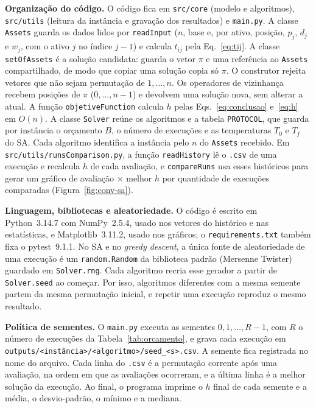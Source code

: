 \textbf{Organização do código.} O código fica em \texttt{src/core} (modelo e algoritmos), \texttt{src/utils} (leitura da instância e gravação dos resultados) e \texttt{main.py}. A classe \texttt{Assets} guarda os dados lidos por \texttt{readInput} ($n$, base e, por ativo, posição, $p_j$, $d_j$ e $w_j$, com o ativo $j$ no índice $j-1$) e calcula $t_{ij}$ pela Eq.~\eqref{eq:tij}. A classe \texttt{setOfAssets} é a solução candidata: guarda o vetor $\pi$ e uma referência ao \texttt{Assets} compartilhado, de modo que copiar uma solução copia só $\pi$. O construtor rejeita vetores que não sejam permutação de $1,\dots,n$. Os operadores de vizinhança recebem posições de $\pi$ ($0,\dots,n-1$) e devolvem uma solução nova, sem alterar a atual. A função \texttt{objetiveFunction} calcula $h$ pelas Eqs.~\eqref{eq:conclusao} e~\eqref{eq:h} em $O(n)$. A classe \texttt{Solver} reúne os algoritmos e a tabela \texttt{PROTOCOL}, que guarda por instância o orçamento $B$, o número de execuções e as temperaturas $T_0$ e $T_f$ do SA. Cada algoritmo identifica a instância pelo $n$ do \texttt{Assets} recebido. Em \texttt{src/utils/runsComparison.py}, a função \texttt{readHistory} lê o \texttt{.csv} de uma execução e recalcula $h$ de cada avaliação, e \texttt{compareRuns} usa esses históricos para gerar um gráfico de avaliação $\times$ melhor $h$ por quantidade de execuções comparadas (Figura~\ref{fig:conv-sa}).

\textbf{Linguagem, bibliotecas e aleatoriedade.} O código é escrito em Python~3.14.7 com NumPy~2.5.4, usado nos vetores do histórico e nas estatísticas, e Matplotlib~3.11.2, usado nos gráficos; o \texttt{requirements.txt} também fixa o pytest~9.1.1. No SA e no \textit{greedy descent}, a única fonte de aleatoriedade de uma execução é um \texttt{random.Random} da biblioteca padrão (Mersenne Twister) guardado em \texttt{Solver.rng}. Cada algoritmo recria esse gerador a partir de \texttt{Solver.seed} ao começar. Por isso, algoritmos diferentes com a mesma semente partem da mesma permutação inicial, e repetir uma execução reproduz o mesmo resultado.

\textbf{Política de sementes.} O \texttt{main.py} executa as sementes $0,1,\dots,R-1$, com $R$ o número de execuções da Tabela~\ref{tab:orcamento}, e grava cada execução em \texttt{outputs/<instância>/<algoritmo>/seed\_<s>.csv}. A semente fica registrada no nome do arquivo. Cada linha do \texttt{.csv} é a permutação corrente após uma avaliação, na ordem em que as avaliações ocorreram, e a última linha é a melhor solução da execução. Ao final, o programa imprime o $h$ final de cada semente e a média, o desvio-padrão, o mínimo e a mediana.

